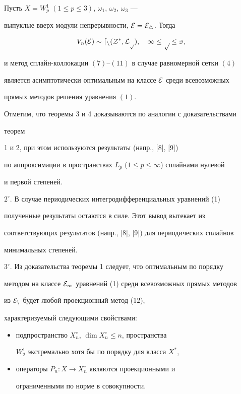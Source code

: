  


 


\begin{thm} 


Пусть $X=W^1_p$ $(1\le p\le3)$, $\omega_1$, $\omega_2$, $\omega_3$ --- 


выпуклые вверх модули непрерывности, $\cal E=\cal E_4$. Тогда 


$$ 


V_n(\cal E)\sim d_n(Z^*,L_p),\quad 1\le p\le3, 


$$ 


и метод сплайн-коллокации $(7)$--$(11)$ в случае равномерной сетки $(4)$ 


является асимптотически оптимальным на классе $\cal E$ среди всевозможных 


прямых методов решения уравнения $(1)$. 


\end{thm} 


 


 


Отметим, что теоремы 3 и 4 доказываются по аналогии с доказательствами 


теорем 


1 и 2, при этом используются результаты (напр., [8], [9]) 


по аппроксимации в пространствах $L_p$ ($1\le p\le\infty$) сплайнами нулевой 


и первой степеней. 


 


$2^\circ$. В случае периодических интегродифференциальных уравнений (1) 


полученные результаты остаются в силе. Этот вывод вытекает из 


соответствующих результатов (напр., [8], [9]) для периодических сплайнов 


минимальных степеней. 


 


$3^\circ$. Из доказательства теоремы 1 следует, что оптимальным по порядку 


методом на классе $\cal E_1$ уравнений (1) среди всевозможных прямых методов 


из $\cal E_n$ будет любой проекционный метод (12), 


характеризуемый следующими свойствами:


\begin{itemize} 


\item[а)] подпространство $X^\circ_n$, $\dim X^\circ_n\le n$, пространства 


$W^1_2$ экстремально хотя бы по порядку для класса $X^*$, 


\item[б)] операторы $P_n:X\to X^\circ_n$ являются проекционными и 


ограниченными по норме в совокупности. 


\end{itemize} 



